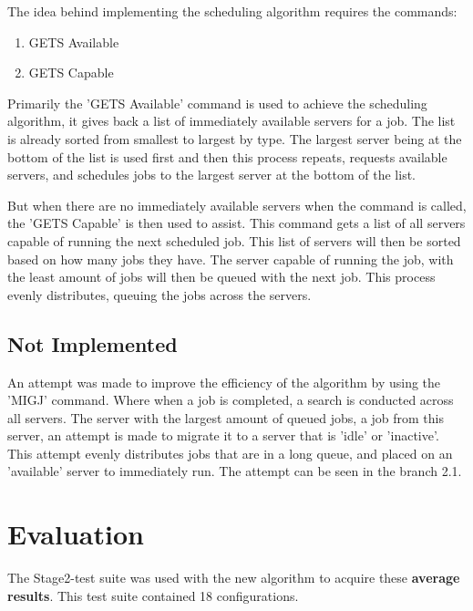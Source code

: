\documentclass[a4paper]{article} %
\begin{document}
The idea behind implementing the scheduling algorithm requires the commands:

\begin{enumerate}
    \item GETS Available
    \item GETS Capable
\end{enumerate}

Primarily the 'GETS Available' command is used to achieve the scheduling algorithm, it gives back a list of immediately available servers for a job. The list is already sorted from smallest to largest by type. The largest server being at the bottom of the list is used first and then this process repeats, requests available servers, and schedules jobs to the largest server at the bottom of the list.
\medskip

But when there are no immediately available servers when the command is called, the 'GETS Capable' is then used to assist. This command gets a list of all servers capable of running the next scheduled job. This list of servers will then be sorted based on how many jobs they have. The server capable of running the job, with the least amount of jobs will then be queued with the next job. This process evenly distributes, queuing the jobs across the servers.

\subsection*{Not Implemented}
An attempt was made to improve the efficiency of the algorithm by using the 'MIGJ' command. Where when a job is completed, a search is conducted across all servers. The server with the largest amount of queued jobs, a job from this server, an attempt is made to migrate it to a server that is 'idle' or 'inactive'. This attempt evenly distributes jobs that are in a long queue, and placed on an 'available' server to immediately run. The attempt can be seen in the branch 2.1.

\break
\section{Evaluation}
The Stage2-test suite was used with the new algorithm to acquire these \textbf{average results}. This test suite contained 18 configurations.
\end{document}
